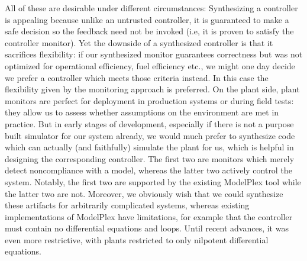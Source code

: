 \documentclass[12pt]{cmuthesis}
\theoremstyle{definition}
\theoremstyle{remark}
\newcommand{\ModelPlex}{ModelPlex\xspace}
\begin{document}
All of these are desirable under different circumstances:
Synthesizing a controller is appealing because unlike an untrusted controller, it is guaranteed to make a safe decision so the feedback need not be invoked (i.e, it is proven to satisfy the controller monitor).
Yet the downside of a synthesized controller is that it sacrifices flexibility: if our synthesized monitor guarantees correctness but was not optimized for operational efficiency, fuel efficiency etc., we might one day decide we prefer a controller which meets those criteria instead.
In this case the flexibility given by the monitoring approach is preferred.
On the plant side, plant monitors are perfect for deployment in production systems or during field tests: they allow us to assess whether assumptions on the environment are met in practice.
But in early stages of development, especially if there is not a purpose built simulator for our system already, we would much prefer to synthesize code which can actually (and faithfully) simulate the plant for us, which is helpful in designing the corresponding controller.
The first two are monitors which merely detect noncompliance with a model, whereas the latter two actively control the system.
Notably, the first two are supported by the existing \ModelPlex tool while the latter two are not.
Moreover, we obviously wish that we could synthesize these artifacts for arbitrarily complicated systems, whereas existing implementations of \ModelPlex have limitations, for example that the controller must contain no differential equations and loops.
Until recent advances, it was even more restrictive, with plants restricted to only nilpotent differential equations.
\end{document}
